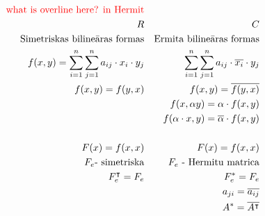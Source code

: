 \documentclass[12pt]{article}
\begin{document}
\begin{align*}
	\color{red}{\text{what is overline here? in Hermit}} \\
	R &  & C  & & \\
	\text{Simetriskas bilineāras formas} & & \text{Ermita bilineāras formas} & & \\
	f(x,y) = \sum_{i = 1}^n \sum_{j = 1}^n a_{ij} \cdot x_i \cdot y_j & &  \sum_{i = 1}^n \sum_{j = 1}^n a_{ij} \cdot \overline{x_i} \cdot y_j & & \\ 
	f(x,y) = f(y,x) & & f(x,y) = \overline{f(y,x)} & & \\
	& & f(x, \alpha y) = \alpha \cdot f(x,y) & & \\
	& & f(\alpha \cdot x, y) = \overline{\alpha} \cdot f(x,y) & & \\
	\\
	F(x) = f(x,x) & & F(x) = f(x,x) & & \\
	F_e \text{- simetriska} & & F_e \text{ - Hermitu matrica} & & \\
	F^{\intercal}_e = F_e & & F_e^{*} = F_e & & \\
	& & a_{ji} = \overline{a_{ij}} & & \\
	& & A^{*} = \overline{A^\intercal} & &
\end{align*}



\begin{gather}
\end{gather}
\end{document}
